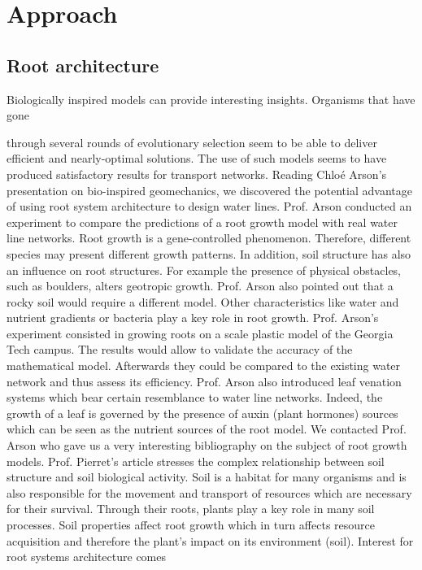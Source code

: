 ﻿\chapter{Approach}
\label{capitolo3}
\thispagestyle{empty}


\section{Root architecture}
\parindent Biologically inspired models can provide interesting insights. Organisms that have gone

through several rounds of evolutionary selection seem to be able to deliver efficient and
nearly-optimal solutions. The use of such models seems to have produced satisfactory
results for transport networks.
Reading Chloé Arson’s presentation on bio-inspired geomechanics, we discovered the
potential advantage of using root system architecture to design water lines. Prof. Arson
conducted an experiment to compare the predictions of a root growth model with real
water line networks. Root growth is a gene-controlled phenomenon. Therefore, different
species may present different growth patterns. In addition, soil structure has also an influence
on root structures. For example the presence of physical obstacles, such as boulders,
alters geotropic growth. Prof. Arson also pointed out that a rocky soil would require a different model. Other characteristics like water and nutrient gradients or bacteria play
a key role in root growth. Prof. Arson’s experiment consisted in growing roots on a
scale plastic model of the Georgia Tech campus. The results would allow to validate the
accuracy of the mathematical model. Afterwards they could be compared to the existing
water network and thus assess its efficiency. Prof. Arson also introduced leaf venation
systems which bear certain resemblance to water line networks. Indeed, the growth of a
leaf is governed by the presence of auxin (plant hormones) sources which can be seen as
the nutrient sources of the root model.
We contacted Prof. Arson who gave us a very interesting bibliography on the subject
of root growth models. Prof. Pierret’s article stresses the complex relationship between
soil structure and soil biological activity. Soil is a habitat for many organisms and is
also responsible for the movement and transport of resources which are necessary for
their survival. Through their roots, plants play a key role in many soil processes. Soil
properties affect root growth which in turn affects resource acquisition and therefore the
plant’s impact on its environment (soil). Interest for root systems architecture comes

